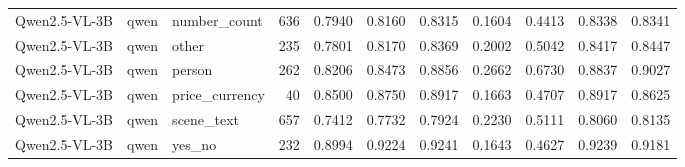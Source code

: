 \begin{tabular}{lllrrrrrrrr}
Qwen2.5-VL-3B & qwen & number_count & 636 & 0.7940 & 0.8160 & 0.8315 & 0.1604 & 0.4413 & 0.8338 & 0.8341 \\
Qwen2.5-VL-3B & qwen & other & 235 & 0.7801 & 0.8170 & 0.8369 & 0.2002 & 0.5042 & 0.8417 & 0.8447 \\
Qwen2.5-VL-3B & qwen & person & 262 & 0.8206 & 0.8473 & 0.8856 & 0.2662 & 0.6730 & 0.8837 & 0.9027 \\
Qwen2.5-VL-3B & qwen & price_currency & 40 & 0.8500 & 0.8750 & 0.8917 & 0.1663 & 0.4707 & 0.8917 & 0.8625 \\
Qwen2.5-VL-3B & qwen & scene_text & 657 & 0.7412 & 0.7732 & 0.7924 & 0.2230 & 0.5111 & 0.8060 & 0.8135 \\
Qwen2.5-VL-3B & qwen & yes_no & 232 & 0.8994 & 0.9224 & 0.9241 & 0.1643 & 0.4627 & 0.9239 & 0.9181 \\
\bottomrule
\end{tabular}
